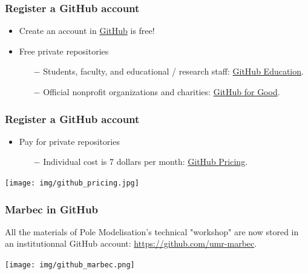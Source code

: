 \documentclass[svgnames]{beamer}
\begin{document}
\begin{frame}
\frametitle{Register a GitHub account}
  \begin{itemize}
    \item Create an account in \href{https://github.com/}{ GitHub} is free! \hfill \break
    \item Free private repositories
        \begin{itemize}
        \item[$-$] Students, faculty, and educational / research staff: \href{https://education.github.com/}{ GitHub Education}.
        \item[$-$] Official nonprofit organizations and charities: \href{https://github.com/nonprofit}{ GitHub for Good}.
       \end{itemize}
        
\end{itemize}
\end{frame}

\begin{frame}
\frametitle{Register a GitHub account}
\begin{itemize}
    \item Pay for private repositories
    \begin{itemize}
    \item[$-$] Individual cost is 7 dollars per month: \href{https://github.com/pricing}{ GitHub Pricing}.
    \end{itemize}

\end{itemize}

\begin{center}
\texttt{[image: img/github\_pricing.jpg]}
\end{center}  
\end{frame}

\begin{frame}
\frametitle{Marbec in GitHub}

    All the materials of Pole Modelisation's technical "workshop" are now stored in an institutionnal GitHub account: \url{https://github.com/umr-marbec}.

\begin{center}
\texttt{[image: img/github\_marbec.png]}
\end{center}  
\end{frame}
\end{document}
